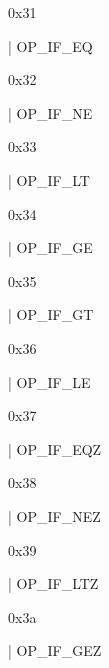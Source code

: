 \documentclass[11pt]{article}
\begin{document}
\begin{ocamldoccomment}
0x31
\end{ocamldoccomment}
\begin{ocamldoccode}
  | OP_IF_EQ
\end{ocamldoccode}
\begin{ocamldoccomment}
0x32
\end{ocamldoccomment}
\begin{ocamldoccode}
  | OP_IF_NE
\end{ocamldoccode}
\begin{ocamldoccomment}
0x33
\end{ocamldoccomment}
\begin{ocamldoccode}
  | OP_IF_LT
\end{ocamldoccode}
\begin{ocamldoccomment}
0x34
\end{ocamldoccomment}
\begin{ocamldoccode}
  | OP_IF_GE
\end{ocamldoccode}
\begin{ocamldoccomment}
0x35
\end{ocamldoccomment}
\begin{ocamldoccode}
  | OP_IF_GT
\end{ocamldoccode}
\begin{ocamldoccomment}
0x36
\end{ocamldoccomment}
\begin{ocamldoccode}
  | OP_IF_LE
\end{ocamldoccode}
\begin{ocamldoccomment}
0x37
\end{ocamldoccomment}
\begin{ocamldoccode}
  | OP_IF_EQZ
\end{ocamldoccode}
\begin{ocamldoccomment}
0x38
\end{ocamldoccomment}
\begin{ocamldoccode}
  | OP_IF_NEZ
\end{ocamldoccode}
\begin{ocamldoccomment}
0x39
\end{ocamldoccomment}
\begin{ocamldoccode}
  | OP_IF_LTZ
\end{ocamldoccode}
\begin{ocamldoccomment}
0x3a
\end{ocamldoccomment}
\begin{ocamldoccode}
  | OP_IF_GEZ
\end{ocamldoccode}
\end{document}
